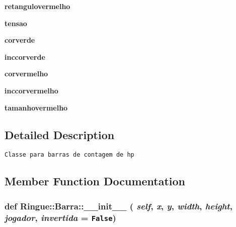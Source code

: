 \begin{CompactItemize}
\item 
\hypertarget{class_ringue_1_1_barra_1f7797e22c9d29149bf34a84348744f9}{
\textbf{retangulovermelho}}
\label{class_ringue_1_1_barra_1f7797e22c9d29149bf34a84348744f9}

\item 
\hypertarget{class_ringue_1_1_barra_9a81d827d6c5001a2361d0ca5796b10f}{
\textbf{tensao}}
\label{class_ringue_1_1_barra_9a81d827d6c5001a2361d0ca5796b10f}

\item 
\hypertarget{class_ringue_1_1_barra_1c6bbb5855284db78da5ee7fd4b9cef4}{
\textbf{corverde}}
\label{class_ringue_1_1_barra_1c6bbb5855284db78da5ee7fd4b9cef4}

\item 
\hypertarget{class_ringue_1_1_barra_5587ba548bfbd90fc3e869718e44c5f9}{
\textbf{inccorverde}}
\label{class_ringue_1_1_barra_5587ba548bfbd90fc3e869718e44c5f9}

\item 
\hypertarget{class_ringue_1_1_barra_c777dcc274ab694d5032d4f4af6a2dce}{
\textbf{corvermelho}}
\label{class_ringue_1_1_barra_c777dcc274ab694d5032d4f4af6a2dce}

\item 
\hypertarget{class_ringue_1_1_barra_9fe6de9c7f0c75076047a8a14b8c3bad}{
\textbf{inccorvermelho}}
\label{class_ringue_1_1_barra_9fe6de9c7f0c75076047a8a14b8c3bad}

\item 
\hypertarget{class_ringue_1_1_barra_335f10a6da2fe264805f1c5e1bc23cb6}{
\textbf{tamanhovermelho}}
\label{class_ringue_1_1_barra_335f10a6da2fe264805f1c5e1bc23cb6}

\end{CompactItemize}


\subsection{Detailed Description}


\begin{footnotesize}\begin{verbatim}Classe para barras de contagem de hp\end{verbatim}
\end{footnotesize}
 

\subsection{Member Function Documentation}
\hypertarget{class_ringue_1_1_barra_4784aa1c68606ba4a8aa1d1f77c715a2}{
\subsubsection[{\_\-\_\-init\_\-\_\-}]{\setlength{\rightskip}{0pt plus 5cm}def Ringue::Barra::\_\-\_\-init\_\-\_\- ( {\em self}, \/   {\em x}, \/   {\em y}, \/   {\em width}, \/   {\em height}, \/   {\em jogador}, \/   {\em invertida} = {\tt False})}}
\label{class_ringue_1_1_barra_4784aa1c68606ba4a8aa1d1f77c715a2}




